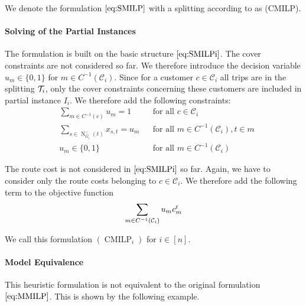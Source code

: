 We denote the formulation $\eqref{eq:SMILP}$ with a splitting according to  as (CMILP).

\paragraph{Solving of the Partial Instances} \parfill

The formulation is built on the basic structure $\eqref{eq:SMILPi}$. The cover constraints are not considered so far. We therefore introduce the decision variable $u_m\in\{0,1\}$ for $m\in C^{-1}\left(\mathcal{C}_i\right)$. Since for a customer $c\in\mathcal{C}_i$ all trips are in the splitting $\mathcal{T}_i$, only the cover constraints concerning these customers are included in partial instance $I_i$. We therefore add the following constraints:
\begin{align}
	& \sum_{m\in C^{-1}(c)} u_m = 1 && \text{for all } c\in\mathcal{C}_i \label{eq:CMILP:customer} \\
	& \sum_{s\in\operatorname{N}_{\overline{G}_i}^-(t)} x_{s,t} = u_m && \text{for all } m\in C^{-1}\left(\mathcal{C}_i\right), t\in m \label{eq:CMILP:route} \\
	& u_m\in\{0,1\} && \text{for all } m\in C^{-1}\left(\mathcal{C}_i\right) \label{eq:CMILP:um}
\end{align}

The route cost is not considered in $\eqref{eq:SMILPi}$ so far. Again, we have to consider only the route costs belonging to $c\in\mathcal{C}_i$. We therefore add the following term to the objective function
\begin{align*}
	\sum_{m\in C^{-1}\left(\mathcal{C}_i\right)} u_m c^{\operatorname{r}}_m
\end{align*}

We call this formulation $(\operatorname{CMILP}_i)$ for $i\in[n]$.

\paragraph{Model Equivalence} \parfill

This heuristic formulation is not equivalent to the original formulation $\eqref{eq:MMILP}$. This is shown by the following example.

